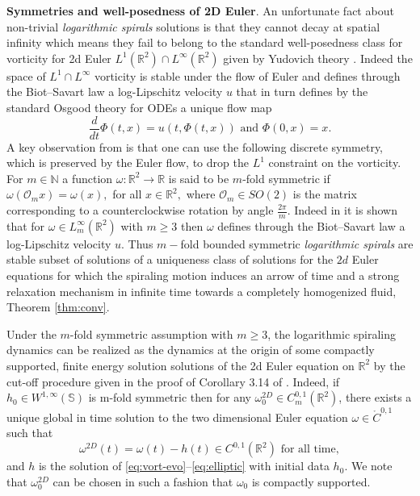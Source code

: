 \documentclass[10pt]{article}
\theoremstyle{definition}
\theoremstyle{remark}
\numberwithin{equation}{section}
\newcommand{\0}{\emptyset}
\begin{document}
    \noindent\textbf{Symmetries and well-posedness of 2D Euler}. An unfortunate fact about non-trivial \textit{logarithmic spirals} solutions is that they cannot decay at spatial infinity which means they fail to belong to the standard well-posedness class for vorticity for 2d Euler $L^1(\mathbb{R}^2)\cap L^\infty(\mathbb{R}^2)$ given by Yudovich theory \cite{Y1}. Indeed the space of $L^1\cap L^\infty$ vorticity is stable under the flow of Euler and defines through the Biot--Savart law a log-Lipschitz velocity $u$ that in turn defines by the standard Osgood theory for ODEs a unique flow map 
	\[
	\frac{d}{dt}\Phi(t,x)=u\left(t,\Phi(t,x)\right) \text{ and } \Phi(0,x)=x.
	\]
	A key observation from \cite{EJ1} is that one can use the following discrete symmetry, which is preserved by the Euler flow, to drop the $L^1$ constraint on the vorticity. For $m\in\mathbb{N}$ a function
	$\omega:\mathbb{R}^2\rightarrow\mathbb{R}$ is said to be $m$-fold symmetric if $\omega(\mathcal{O}_{m}x)=\omega(x),$ for all $x\in\mathbb{R}^2,$ where $\mathcal{O}_m\in SO(2)$ is the matrix corresponding to a counterclockwise rotation by angle $\frac{2\pi}{m}.$ Indeed in \cite{EJ1} it is shown that for $\omega \in L^\infty_m(\mathbb{R}^2)$ with $m\geq 3$ then $\omega$ defines through the Biot--Savart law a log-Lipschitz velocity $u$. Thus $m-$fold bounded symmetric \textit{logarithmic spirals} are stable subset of solutions of a uniqueness class of solutions for the $2d$ Euler equations for which the spiraling motion induces an arrow of time and a strong relaxation mechanism in infinite time towards a completely homogenized fluid, Theorem \ref{thm:conv}. 

\medskip 

 \noindent Under the $m$-fold symmetric assumption with $m\ge 3$, the logarithmic spiraling dynamics can be realized as the dynamics at the origin of some compactly supported, finite energy solution solutions of the 2d Euler equation on $\mathbb{R}^2$ by the cut-off procedure given in the proof of Corollary 3.14 of \cite{EJ1}. Indeed, if $h_0\in W^{1,\infty}(\mathbb{S})$ is m-fold symmetric then for any $\omega^{2D}_0\in C^{0,1}_m\left(\mathbb{R}^2\right)$, there exists a unique global in time solution to the two dimensional Euler equation $\omega\in \mathring{C}^{0,1}$ such that 
 \[
 \omega^{2D}(t)=\omega(t)-h(t)\in C^{0,1}\left(\mathbb{R}^2\right) \text{ for all time},
 \]
and $h$ is the solution of \eqref{eq:vort-evo}--\eqref{eq:elliptic} with initial data $h_0$. We note that $\omega^{2D}_0$ can be chosen in such a fashion that $\omega_0$ is compactly supported.
	
\end{document}
